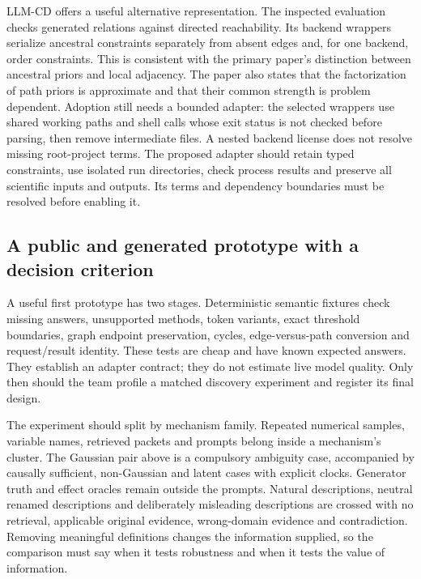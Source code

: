 LLM-CD offers a useful alternative representation. The inspected
evaluation checks generated relations against directed reachability. Its
backend wrappers serialize ancestral constraints separately from absent
edges and, for one backend, order constraints. This is consistent with
the primary paper's distinction between ancestral priors and local
adjacency. The paper also states that the factorization of path priors
is approximate and that their common strength is problem dependent.
\citep{exec14_iid_cd,v12_la_2306_16902} Adoption still needs a bounded
adapter: the selected wrappers use shared working paths and shell calls
whose exit status is not checked before parsing, then remove
intermediate files. A nested backend license does not resolve missing
root-project terms. The proposed adapter should retain typed
constraints, use isolated run directories, check process results and
preserve all scientific inputs and outputs. Its terms and dependency
boundaries must be resolved before enabling it.

\hypertarget{a-public-and-generated-prototype-with-a-decision-criterion}{%
\subsection{A public and generated prototype with a decision
criterion}\label{a-public-and-generated-prototype-with-a-decision-criterion}}

A useful first prototype has two stages. Deterministic semantic fixtures
check missing answers, unsupported methods, token variants, exact
threshold boundaries, graph endpoint preservation, cycles,
edge-versus-path conversion and request/result identity. These tests are
cheap and have known expected answers. They establish an adapter
contract; they do not estimate live model quality. Only then should the
team profile a matched discovery experiment and register its final
design.

The experiment should split by mechanism family. Repeated numerical
samples, variable names, retrieved packets and prompts belong inside a
mechanism's cluster. The Gaussian pair above is a compulsory ambiguity
case, accompanied by causally sufficient, non-Gaussian and latent cases
with explicit clocks. Generator truth and effect oracles remain outside
the prompts. Natural descriptions, neutral renamed descriptions and
deliberately misleading descriptions are crossed with no retrieval,
applicable original evidence, wrong-domain evidence and contradiction.
Removing meaningful definitions changes the information supplied, so the
comparison must say when it tests robustness and when it tests the value
of information.

